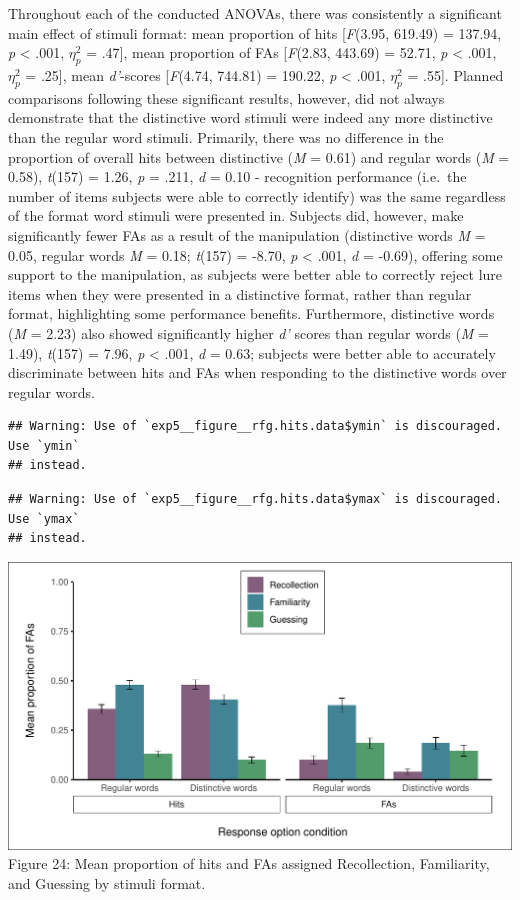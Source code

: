 \documentclass[
  11pt,
]{article}
\begin{document}
Throughout each of the conducted ANOVAs, there was consistently a
significant main effect of stimuli format: mean proportion of hits
{[}\emph{F}(3.95, 619.49) = 137.94, \emph{p} \textless{} .001,
\(\eta^2_p\) = .47{]}, mean proportion of FAs {[}\emph{F}(2.83, 443.69)
= 52.71, \emph{p} \textless{} .001, \(\eta^2_p\) = .25{]}, mean
\emph{d'}-scores {[}\emph{F}(4.74, 744.81) = 190.22, \emph{p}
\textless{} .001, \(\eta^2_p\) = .55{]}. Planned comparisons following
these significant results, however, did not always demonstrate that the
distinctive word stimuli were indeed any more distinctive than the
regular word stimuli. Primarily, there was no difference in the
proportion of overall hits between distinctive (\emph{M} = 0.61) and
regular words (\emph{M} = 0.58), \emph{t}(157) = 1.26, \emph{p} = .211,
\emph{d} = 0.10 - recognition performance (i.e.~the number of items
subjects were able to correctly identify) was the same regardless of the
format word stimuli were presented in. Subjects did, however, make
significantly fewer FAs as a result of the manipulation (distinctive
words \emph{M} = 0.05, regular words \emph{M} = 0.18; \emph{t}(157) =
-8.70, \emph{p} \textless{} .001, \emph{d} = -0.69), offering some
support to the manipulation, as subjects were better able to correctly
reject lure items when they were presented in a distinctive format,
rather than regular format, highlighting some performance benefits.
Furthermore, distinctive words (\emph{M} = 2.23) also showed
significantly higher \emph{d'} scores than regular words (\emph{M} =
1.49), \emph{t}(157) = 7.96, \emph{p} \textless{} .001, \emph{d} = 0.63;
subjects were better able to accurately discriminate between hits and
FAs when responding to the distinctive words over regular words.

\begin{verbatim}
## Warning: Use of `exp5__figure__rfg.hits.data$ymin` is discouraged. Use `ymin`
## instead.
\end{verbatim}

\begin{verbatim}
## Warning: Use of `exp5__figure__rfg.hits.data$ymax` is discouraged. Use `ymax`
## instead.
\end{verbatim}

\includegraphics{R--Thesis_files/figure-latex/unnamed-chunk-83-1.pdf}
Figure 24: Mean proportion of hits and FAs assigned Recollection,
Familiarity, and Guessing by stimuli format.
\end{document}
